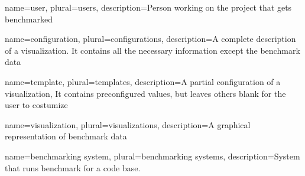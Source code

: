 \makenoidxglossaries

{
	name=user,
	plural=users,
	description={Person working on the project that gets benchmarked}
}

{
	name=configuration,
	plural=configurations,
	description={A complete description of a \gls{visualization}. It contains all the necessary information except the benchmark data}
}

{
	name=template,
	plural=templates,
	description={A partial configuration of a \gls{visualization}, It contains preconfigured values, but leaves others blank for the user to costumize}
}

{
	name=visualization,
	plural=visualizations,
	description={A graphical representation of benchmark data}
}

{
	name=benchmarking system,
	plural=benchmarking systems,
	description={System that runs benchmark for a code base.}
}


